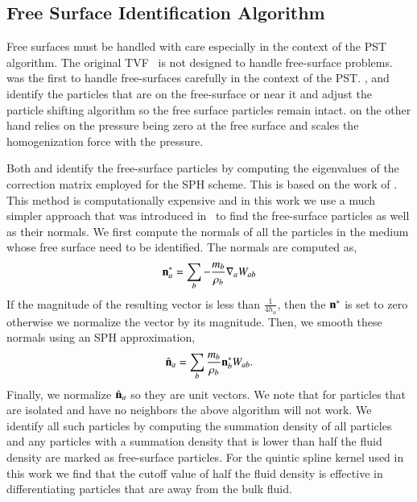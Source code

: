 \subsection{Free Surface Identification Algorithm}
\label{subsec:free-surface}

Free surfaces must be handled with care especially in the context of the PST
algorithm. The original TVF~\citep{Adami2013} is not designed to handle
free-surface problems. \cite{diff_smoothing_sph:lind:jcp:2012} was the first
to handle free-surfaces carefully in the context of the PST.
\cite{diff_smoothing_sph:lind:jcp:2012,oger_ale_sph_2016}, and
\cite{sun_consistent_2019} identify the particles that are on the
free-surface or near it and adjust the particle shifting algorithm so the free
surface particles remain intact. \cite{zhang_hu_adams17} on the other hand
relies on the pressure being zero at the free surface and scales the
homogenization force with the pressure.

Both \citep{oger_ale_sph_2016} and \citep{sun_consistent_2019} identify the
free-surface particles by computing the eigenvalues of the correction matrix
employed for the SPH scheme. This is based on the work of
\citep{marrone:sph:level-set:2010}. This method is computationally expensive
and in this work we use a much simpler approach that was introduced
in~\citep{muta_efficient_2020} to find the free-surface particles as well as
their normals. We first compute the normals of all the particles in the medium
whose free surface need to be identified. The normals are computed as,
\begin{equation}
  \label{eq:normal-approx}
  \mathbf{n}^*_a = \sum_b -\frac{m_b}{\rho_b} \nabla_a W_{ab}
\end{equation}
%
If the magnitude of the resulting vector is less than $\frac{1}{4h_a}$, then
the $\mathbf{n}^*$ is set to zero otherwise we normalize the vector by its
magnitude. Then, we smooth these normals using an SPH approximation,
\begin{equation}
  \label{eq:normal}
  \hat{\mathbf{n}}_a = \sum_b \frac{m_b}{\rho_b}\mathbf{n}^*_b W_{ab}.
\end{equation}
Finally, we normalize $\hat{\mathbf{n}}_a$ so they are unit vectors. We note that
for particles that are isolated and have no neighbors the above algorithm will
not work. We identify all such particles by computing the summation density of
all particles and any particles with a summation density that is lower than
half the fluid density are marked as free-surface particles. For the quintic
spline kernel used in this work we find that the cutoff value of half the
fluid density is effective in differentiating particles that are away from the
bulk fluid.

